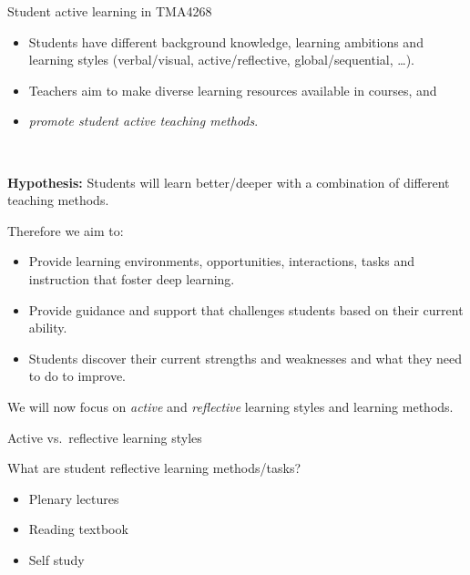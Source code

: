 \documentclass[10pt,ignorenonframetext,]{beamer}
\providecommand{\tightlist}{%
  \setlength{\itemsep}{0pt}\setlength{\parskip}{0pt}}
\begin{document}
\begin{frame}

\begin{block}{Student active learning in TMA4268}

\begin{itemize}
\item
  Students have different background knowledge, learning ambitions and
  learning styles (verbal/visual, active/reflective, global/sequential,
  \ldots{}). ~
\item
  Teachers aim to make diverse learning resources available in courses,
  and ~
\item
  \emph{promote student active teaching methods}.
\end{itemize}

~

\textbf{Hypothesis:} Students will learn better/deeper with a
combination of different teaching methods.

\end{block}

\end{frame}

\begin{frame}

Therefore we aim to:

\begin{itemize}
\tightlist
\item
  Provide learning environments, opportunities, interactions, tasks and
  instruction that foster deep learning.
\item
  Provide guidance and support that challenges students based on their
  current ability.
\item
  Students discover their current strengths and weaknesses and what they
  need to do to improve.
\end{itemize}

We will now focus on \emph{active} and \emph{reflective} learning styles
and learning methods.

\end{frame}

\begin{frame}

\begin{block}{Active vs.~reflective learning styles}

\begin{block}{What are student reflective learning methods/tasks?}

\begin{itemize}
\tightlist
\item
  Plenary lectures
\item
  Reading textbook
\item
  Self study
\end{itemize}

\end{block}

\end{block}

\end{frame}
\end{document}
